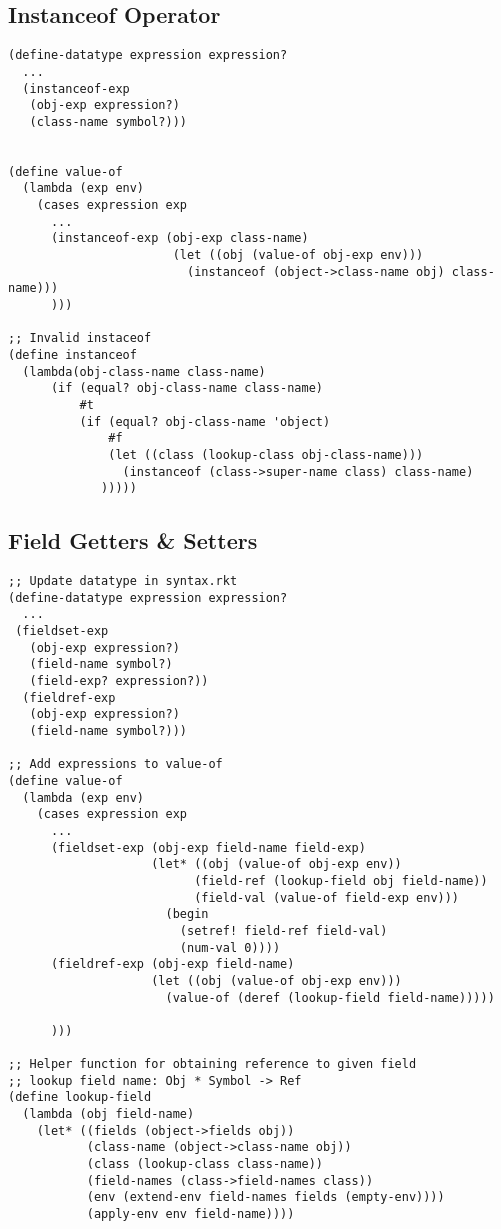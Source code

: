 \documentclass[../main.tex]{subfiles}
\begin{document}
\subsection{Instanceof Operator}

\begin{lstlisting}
(define-datatype expression expression?
  ...
  (instanceof-exp
   (obj-exp expression?)
   (class-name symbol?)))


(define value-of
  (lambda (exp env)
    (cases expression exp
      ...
      (instanceof-exp (obj-exp class-name)
                       (let ((obj (value-of obj-exp env)))
                         (instanceof (object->class-name obj) class-name)))
      )))

;; Invalid instaceof
(define instanceof
  (lambda(obj-class-name class-name)
      (if (equal? obj-class-name class-name)
          #t
          (if (equal? obj-class-name 'object)
              #f
              (let ((class (lookup-class obj-class-name)))
                (instanceof (class->super-name class) class-name)
             )))))
\end{lstlisting}

\subsection{Field Getters \& Setters}

\begin{lstlisting}
;; Update datatype in syntax.rkt
(define-datatype expression expression?
  ...
 (fieldset-exp
   (obj-exp expression?)
   (field-name symbol?)
   (field-exp? expression?))
  (fieldref-exp
   (obj-exp expression?)
   (field-name symbol?)))

;; Add expressions to value-of
(define value-of
  (lambda (exp env)
    (cases expression exp
      ...
      (fieldset-exp (obj-exp field-name field-exp)
                    (let* ((obj (value-of obj-exp env))
                          (field-ref (lookup-field obj field-name))
                          (field-val (value-of field-exp env)))
                      (begin
                        (setref! field-ref field-val)
                        (num-val 0))))
      (fieldref-exp (obj-exp field-name)
                    (let ((obj (value-of obj-exp env)))
                      (value-of (deref (lookup-field field-name)))))

      )))

;; Helper function for obtaining reference to given field
;; lookup field name: Obj * Symbol -> Ref
(define lookup-field
  (lambda (obj field-name)
    (let* ((fields (object->fields obj))
           (class-name (object->class-name obj))
           (class (lookup-class class-name))
           (field-names (class->field-names class))
           (env (extend-env field-names fields (empty-env))))
           (apply-env env field-name))))
\end{lstlisting}
\end{document}
